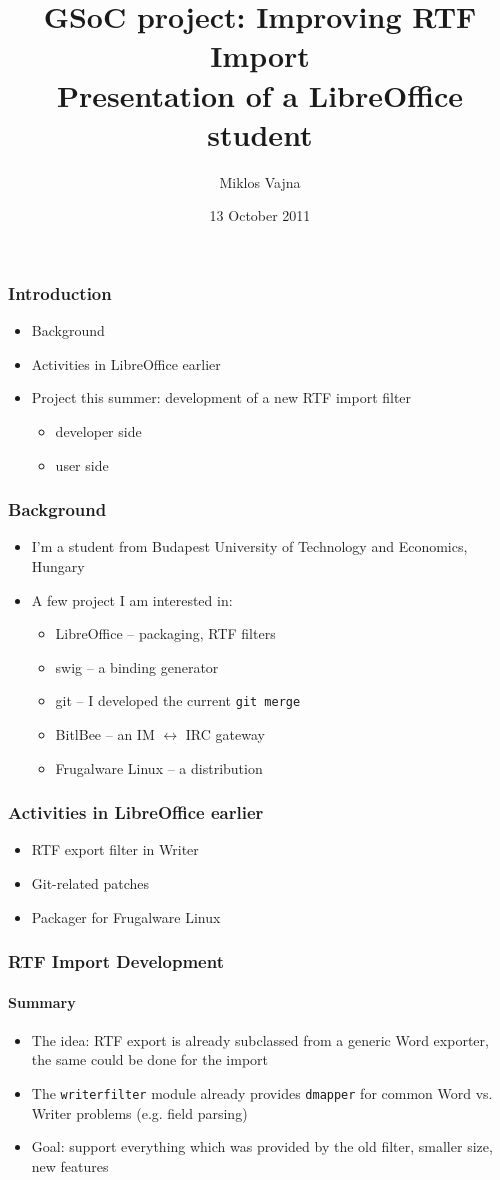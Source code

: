 \documentclass{beamer}
\author{Miklos Vajna}
\begin{document}
\title{GSoC project: Improving RTF Import \\ Presentation of a LibreOffice student}
\date{13 October 2011}

\frame{\titlepage}

\begin{frame}
\frametitle{Introduction}
\begin{itemize}
\item Background
\item Activities in LibreOffice earlier
\item Project this summer: development of a new RTF import filter
\begin{itemize}
\item developer side
\item user side
\end{itemize}
\end{itemize}
\end{frame}


\begin{frame}
\frametitle{Background}
\begin{itemize}
\item I'm a student from Budapest University of Technology and Economics, Hungary
\item A few project I am interested in:
\begin{itemize}
\item LibreOffice -- packaging, RTF filters
\item swig -- a binding generator
\item git -- I developed the current \texttt{git merge}
\item BitlBee -- an IM $\leftrightarrow$ IRC gateway
\item Frugalware Linux -- a distribution
\end{itemize}
\end{itemize}
\end{frame}

\begin{frame}
\frametitle{Activities in LibreOffice earlier}
\begin{itemize}
\item RTF export filter in Writer
\item Git-related patches
\item Packager for Frugalware Linux
\end{itemize}
\end{frame}

\begin{frame}
\frametitle{RTF Import Development}
\framesubtitle{Summary}
\begin{itemize}
\item The idea: RTF export is already subclassed from a generic Word exporter, the same could be done for the import
\item The \texttt{writerfilter} module already provides \texttt{dmapper} for common Word vs. Writer problems (e.g. field parsing)
\item Goal: support everything which was provided by the old filter, smaller size, new features
\end{itemize}
\end{frame}
\end{document}

